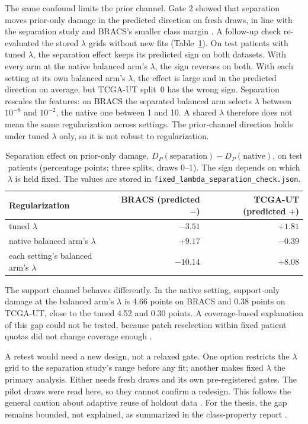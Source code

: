 \documentclass[11pt]{article}
\begin{document}
The same confound limits the prior channel. Gate 2 showed that separation moves prior-only damage in the predicted direction on fresh draws, in line with the separation study and BRACS's smaller class margin \citep{queisler2026separationTcgaBracs, queisler2026classProperties}. A follow-up check re-evaluated the stored $\lambda$ grids without new fits (Table~\ref{tab:fixedprior}). On test patients with tuned $\lambda$, the separation effect keeps its predicted sign on both datasets. With every arm at the native balanced arm's $\lambda$, the sign reverses on both. With each setting at its own balanced arm's $\lambda$, the effect is large and in the predicted direction on average, but TCGA-UT split~0 has the wrong sign. Separation rescales the features: on BRACS the separated balanced arm selects $\lambda$ between $10^{-8}$ and $10^{-2}$, the native one between 1 and 10. A shared $\lambda$ therefore does not mean the same regularization across settings. The prior-channel direction holds under tuned $\lambda$ only, so it is not robust to regularization.

\begin{table}[ht]
  \centering
  \small
  \begin{tabular}{@{}lrr@{}}
    \toprule
    Regularization & BRACS (predicted $-$) & TCGA-UT (predicted $+$) \\
    \midrule
    tuned $\lambda$                      & $-3.51$  & $+1.81$ \\
    native balanced arm's $\lambda$      & $+9.17$  & $-0.39$ \\
    each setting's balanced arm's $\lambda$ & $-10.14$ & $+8.08$ \\
    \bottomrule
  \end{tabular}
  \caption{Separation effect on prior-only damage, $D_P(\text{separation}) - D_P(\text{native})$, on test patients (percentage points; three splits, draws 0--1). The sign depends on which $\lambda$ is held fixed. The values are stored in \texttt{fixed\_lambda\_separation\_check.json}.}
  \label{tab:fixedprior}
\end{table}

\noindent The support channel behaves differently. In the native setting, support-only damage at the balanced arm's $\lambda$ is 4.66 points on BRACS and 0.38 points on TCGA-UT, close to the tuned 4.52 and 0.30 points. A coverage-based explanation of this gap could not be tested, because patch reselection within fixed patient quotas did not change coverage enough \citep{queisler2026supportCoverage}.

A retest would need a new design, not a relaxed gate. One option restricts the $\lambda$ grid to the separation study's range before any fit; another makes fixed $\lambda$ the primary analysis. Either needs fresh draws and its own pre-registered gates. The pilot draws were read here, so they cannot confirm a redesign. This follows the general caution about adaptive reuse of holdout data \citep{dwork2015reusable}. For the thesis, the gap remains bounded, not explained, as summarized in the class-property report \citep{queisler2026classProperties}.



\end{document}
